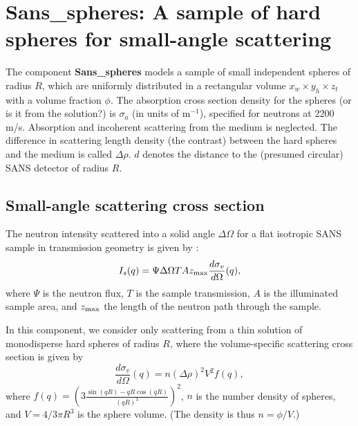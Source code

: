 \section{Sans\_spheres: A sample of hard spheres for small-angle scattering}
\label{sans}


The component {\bf Sans\_spheres} models a sample of small independent
spheres of radius $R$, which are uniformly distributed
in a rectangular volume $x_w \times y_h \times z_t$ with a volume
fraction $\phi$. The absorption cross section density for the spheres
(or is it from the solution?)
is $\sigma_a$ (in units of m$^{-1}$), specified
for neutrons at 2200 m/s. Absorption and incoherent scattering
from the medium is neglected.
The difference in scattering length density
(the contrast) between the hard spheres and the medium is called $\Delta \rho$.
$d$ denotes the distance to the (presumed circular) SANS detector of radius $R$.

\subsection{Small-angle scattering cross section}
The neutron intensity scattered into a solid angle $\Delta \Omega$
for a flat isotropic SANS sample in transmission geometry
is given by \cite{ILLblue}:
\begin{equation}
I_s(q) = \Psi \Delta\Omega T A z_{\rm max} \frac{d\sigma_v}{d\Omega}(q) ,
\end{equation}
where $\Psi$ is the neutron flux, $T$ is the sample transmission,
$A$ is the illuminated sample area, and $z_{\rm max}$ the length of
the neutron path through the sample.

In this component, we consider only scattering from a thin solution
of monodisperse hard spheres of radius $R$, where the volume-specific
scattering cross section is given by \cite{ILLblue}
\begin{equation}
\frac{d\sigma_v}{d\Omega}(q) =
  n (\Delta\rho)^2 V^2 f(q)  ,
\end{equation}
where $f(q) = \left( 3\frac{\sin(qR)-qR\cos(qR)}{(qR)^3} \right)^2$,
$n$ is the number density of spheres, and $V = 4 / 3 \pi R^3$ is the
sphere volume. (The density is thus $n = \phi/V$.)

